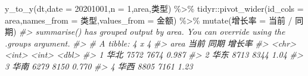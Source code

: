 \documentclass[
]{book}
\newenvironment{Shaded}{\begin{snugshade}}{\end{snugshade}}
\newcommand{\AttributeTok}[1]{\textcolor[rgb]{0.77,0.63,0.00}{#1}}
\newcommand{\CommentTok}[1]{\textcolor[rgb]{0.56,0.35,0.01}{\textit{#1}}}
\newcommand{\DecValTok}[1]{\textcolor[rgb]{0.00,0.00,0.81}{#1}}
\newcommand{\FunctionTok}[1]{\textcolor[rgb]{0.00,0.00,0.00}{#1}}
\newcommand{\NormalTok}[1]{#1}
\newcommand{\OtherTok}[1]{\textcolor[rgb]{0.56,0.35,0.01}{#1}}
\newcommand{\SpecialCharTok}[1]{\textcolor[rgb]{0.00,0.00,0.00}{#1}}
\newcommand{\StringTok}[1]{\textcolor[rgb]{0.31,0.60,0.02}{#1}}
\begin{document}
\begin{Shaded}
\begin{Highlighting}[]
\FunctionTok{y\_to\_y}\NormalTok{(dt,}\AttributeTok{date =} \StringTok{\textquotesingle{}20201001\textquotesingle{}}\NormalTok{,}\AttributeTok{n =} \DecValTok{1}\NormalTok{,area,类型) }\SpecialCharTok{\%\textgreater{}\%} 
\NormalTok{  tidyr}\SpecialCharTok{::}\FunctionTok{pivot\_wider}\NormalTok{(}\AttributeTok{id\_cols =} \StringTok{\textquotesingle{}area\textquotesingle{}}\NormalTok{,}\AttributeTok{names\_from =} \StringTok{\textquotesingle{}类型\textquotesingle{}}\NormalTok{,}\AttributeTok{values\_from =} \StringTok{\textquotesingle{}金额\textquotesingle{}}\NormalTok{) }\SpecialCharTok{\%\textgreater{}\%} 
  \FunctionTok{mutate}\NormalTok{(增长率 }\OtherTok{=}\NormalTok{ 当前 }\SpecialCharTok{/}\NormalTok{ 同期)}
\CommentTok{\#\textgreater{} \textasciigrave{}summarise()\textasciigrave{} has grouped output by \textquotesingle{}area\textquotesingle{}. You can override using the \textasciigrave{}.groups\textasciigrave{} argument.}
\CommentTok{\#\textgreater{} \# A tibble: 4 x 4}
\CommentTok{\#\textgreater{}   area   当前  同期 增长率}
\CommentTok{\#\textgreater{}   \textless{}chr\textgreater{} \textless{}int\textgreater{} \textless{}int\textgreater{}  \textless{}dbl\textgreater{}}
\CommentTok{\#\textgreater{} 1 华北   7572  7674  0.987}
\CommentTok{\#\textgreater{} 2 华东   8713  8344  1.04 }
\CommentTok{\#\textgreater{} 3 华南   6279  8150  0.770}
\CommentTok{\#\textgreater{} 4 华西   8805  7161  1.23}


\end{Highlighting}
\end{Shaded}
\end{document}
